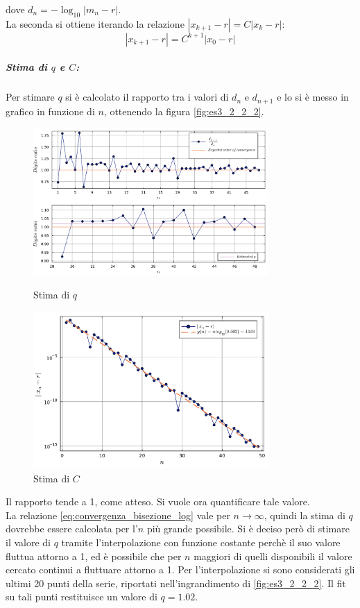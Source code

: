\documentclass[letterpaper, 12pt]{article}
\numberwithin{equation}{section}    %
\begin{document}
dove $d_n = -\log_{10}|m_n - r|$. \\
La seconda si ottiene iterando la relazione  $ |x_{k+1} - r|= C |x_{k} - r|$:
\begin{equation}
    \label{eq:stima_C}
    |x_{k+1} - r|= C^{k+1} |x_{0} - r|
\end{equation}

\subparagraph{Stima di $q$ e $C$:} Per stimare $q$ si è calcolato il rapporto tra i valori di $d_n$ e $d_{n+1}$ e lo si
è messo in grafico in funzione di $n$, ottenendo la figura \ref{fig:es3_2_2_2}.
\begin{figure}[!ht]
    \begin{minipage}[b]{0.54\textwidth}
    \centering
    \includegraphics[width=0.8\textwidth]{3222.pdf}
    \caption{Stima di $q$}
    \label{fig:es3_2_2_2}
    \end{minipage}
    \begin{minipage}[b]{0.54\textwidth}
    \centering
    \includegraphics[width=0.8\textwidth]{3223.pdf}
    \caption{Stima di $C$}
    \label{fig:es3_2_2_3}
    \end{minipage}
\end{figure}

Il rapporto tende a 1, come atteso. Si vuole ora quantificare tale valore. \\
La relazione \ref{eq:convergenza_bisezione_log} vale per $n\to\infty$, quindi la stima di $q$
dovrebbe essere calcolata per l'$n$ più grande possibile. Si
è deciso però di stimare il valore di $q$ tramite l'interpolazione con funzione costante perchè il suo valore 
fluttua attorno a 1, ed è possibile che per $n$ maggiori di quelli disponibili il valore cercato continui a 
fluttuare attorno a 1. Per l'interpolazione si sono considerati gli ultimi 20 punti della serie, riportati 
nell'ingrandimento di \ref{fig:es3_2_2_2}. Il fit su tali punti restituisce
un valore di $q = 1.02$. \\  
\end{document}
